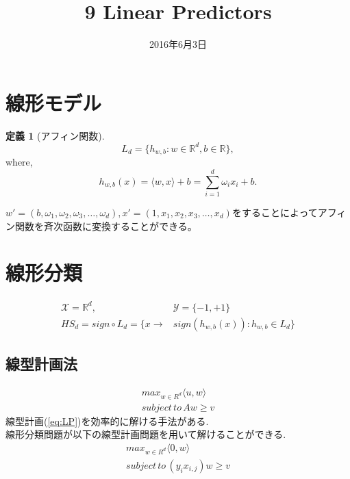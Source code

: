 \documentclass{jarticle}
\title{9 Linear Predictors}
\date{2016年6月3日}
\theoremstyle{definition}
\newtheorem{defi}[thm]{定義}
\begin{document}
\maketitle

\section{線形モデル}
\begin{defi}[アフィン関数]
\begin{equation}
L_d = \{ h_{w,b}:w \in \mathbb{R}^d , b \in \mathbb{R} \}, 
\end{equation}
where, 
\begin{equation}
h_{w,b}(x) = \langle w,x \rangle + b = \sum_{i=1}^d \omega_ix_i + b.
\end{equation}
\end{defi}
$w' = (b,\omega_1,\omega_2,\omega_3,\dots,\omega_d) ,x'=(1,x_1,x_2,x_3,\dots,x_d)$をすることによってアフィン関数を斉次函数に変換することができる。
\section{線形分類}
\begin{equation}
\begin{aligned}
\mathcal{X} = \mathbb{R} ^d, &\mathcal{Y} =\{-1,+1\} \\
HS_d = sign \circ L_d = \{x \to &sign(h_{w,b}(x)) :h_{w,b} \in L_d\}
\end{aligned}
\end{equation}
\subsection{線型計画法}
\begin{equation} \label{eq:LP}
\begin{aligned}
max_{w \in R^d} \langle u,w \rangle \\
subject \, to \, Aw \ge v
\end{aligned}
\end{equation}
線型計画(\ref{eq:LP})を効率的に解ける手法がある. \\
線形分類問題が以下の線型計画問題を用いて解けることができる.
\begin{equation}
\begin{aligned}
max_{w \in R^d} \langle 0,w \rangle \\
subject \, to \, (y_ix_{i,j})w \ge v
\end{aligned}
\end{equation}
\end{document}
